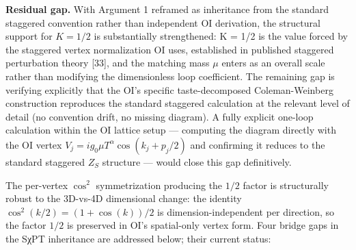 \documentclass[
]{article}
\begin{document}
\textbf{Residual gap.} With Argument 1 reframed as inheritance from the
standard staggered convention rather than independent OI derivation, the
structural support for \(K = 1/2\) is substantially strengthened: K =
1/2 is the value forced by the staggered vertex normalization OI uses,
established in published staggered perturbation theory {[}33{]}, and the
matching mass \(\mu\) enters as an overall scale rather than modifying
the dimensionless loop coefficient. The remaining gap is verifying
explicitly that the OI's specific taste-decomposed Coleman-Weinberg
construction reproduces the standard staggered calculation at the
relevant level of detail (no convention drift, no missing diagram). A
fully explicit one-loop calculation within the OI lattice setup ---
computing the diagram directly with the OI vertex
\(V_j = ig_0\mu T^\alpha\cos(k_j + p_j/2)\) and confirming it reduces to
the standard staggered \(Z_S\) structure --- would close this gap
definitively.

The per-vertex \(\cos^2\) symmetrization producing the \(1/2\) factor is
structurally robust to the 3D-vs-4D dimensional change: the identity
\(\cos^2(k/2) = (1+\cos(k))/2\) is dimension-independent per direction,
so the factor \(1/2\) is preserved in OI's spatial-only vertex form.
Four bridge gaps in the SχPT inheritance are addressed below; their
current status:
\end{document}
